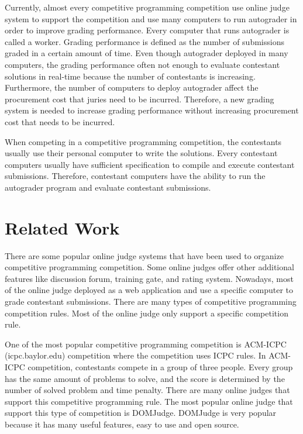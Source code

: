\documentclass[conference,a4paper]{IEEEtran}
\begin{document}
Currently, almost every competitive programming competition use online judge system to support the competition and use many computers to run autograder in order to improve grading performance. Every computer that runs autograder is called a worker. Grading performance is defined as the number of submissions graded in a certain amount of time. Even though autograder deployed in many computers, the grading performance often not enough to evaluate contestant solutions in real-time because the number of contestants is increasing. Furthermore, the number of computers to deploy autograder affect the procurement cost that juries need to be incurred. Therefore, a new grading system is needed to increase grading performance without increasing procurement cost that needs to be incurred.

When competing in a competitive programming competition, the contestants usually use their personal computer to write the solutions. Every contestant computers usually have sufficient specification to compile and execute contestant submissions. Therefore, contestant computers have the ability to run the autograder program and evaluate contestant submissions.

\section{Related Work}

There are some popular online judge systems that have been used to organize competitive programming competition. Some online judges offer other additional features like discussion forum, training gate, and rating system. Nowadays, most of the online judge deployed as a web application and use a specific computer to grade contestant submissions. There are many types of competitive programming competition rules. Most of the online judge only support a specific competition rule.

One of the most popular competitive programming competition is ACM-ICPC (icpc.baylor.edu) competition where the competition uses ICPC rules. In ACM-ICPC competition, contestants compete in a group of three people. Every group has the same amount of problems to solve, and the score is determined by the number of solved problem and time penalty. There are many online judges that support this competitive programming rule. The most popular online judge that support this type of competition is DOMJudge. DOMJudge is very popular because it has many useful features, easy to use and open source.
\end{document}
